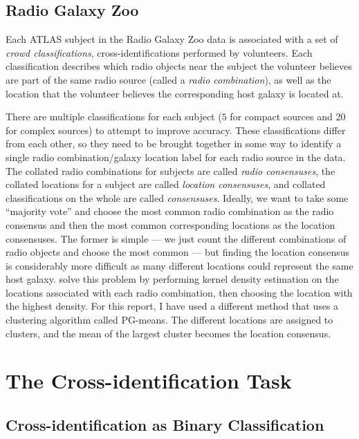 \documentclass[a4paper]{article}
\newcommand{\sect}{Section }
\begin{document}
    \subsection{Radio Galaxy Zoo}

      Each ATLAS subject in the Radio Galaxy Zoo data is associated with a set of \emph{crowd classifications}, cross-identifications performed by volunteers. Each classification describes which radio objects near the subject the volunteer believes are part of the same radio source (called a \emph{radio combination}), as well as the location that the volunteer believes the corresponding host galaxy is located at.

      There are multiple classifications for each subject ($5$ for compact sources and $20$ for complex sources) to attempt to improve accuracy. These classifications differ from each other, so they need to be brought together in some way to identify a single radio combination/galaxy location label for each radio source in the data. The collated radio combinations for subjects are called \emph{radio consensuses}, the collated locations for a subject are called \emph{location consensuses}, and collated classifications on the whole are called \emph{consensuses}. Ideally, we want to take some ``majority vote'' and choose the most common radio combination as the radio consensus and then the most common corresponding locations as the location consensuses. The former is simple --- we just count the different combinations of radio objects and choose the most common --- but finding the location consensus is considerably more difficult as many different locations could represent the same host galaxy. \citet{banfield15} solve this problem by performing kernel density estimation on the locations associated with each radio combination, then choosing the location with the highest density. For this report, I have used a different method that uses a clustering algorithm called PG-means\cite{hamerly07}. The different locations are assigned to clusters, and the mean of the largest cluster becomes the location consensus.%

  \section{The Cross-identification Task}

    \subsection{Cross-identification as Binary Classification}
\end{document}
